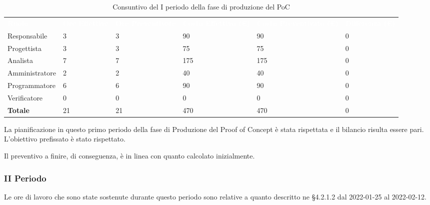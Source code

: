 \begin{table}[H]
\begin{center}
\renewcommand{\arraystretch}{1.5}
\begin{tabular}{ m{}<{\centering}  m{}<{\centering} m{}<{\centering} m{}<{\centering} m{}<{\centering} m{}<{\centering}}
	\rowcolor{darkblue}
	\textcolor{white}{\textbf{Ruolo}} & \textcolor{white}{\textbf{Ore Effettive}} & \textcolor{white}{\textbf{Ore Preventivate}}&\textcolor{white}{\textbf{Costo Effettivo (\euro)}}&\textcolor{white}{\textbf{Costo Preventivato (\euro)}}&\textcolor{white}{\textbf{Differenza (\euro)}}\\ 
	
	Responsabile  & 3 & 3 & 90 & 90 & 0 \\	
	
	Progettista & 3 & 3 & 75 & 75 & 0 \\
	
	Analista & 7 & 7 & 175 & 175 & 0 \\

	Amministratore & 2 & 2 & 40 & 40 & 0 \\
	
	Programmatore & 6 & 6 & 90 & 90 &  0 \\
	
	Verificatore & 0 & 0 & 0 & 0 & 0 \\
	
	\textbf{Totale} & 21 & 21 & 470 & 470 & 0 \\
	
\end{tabular}
\caption{Consuntivo del I periodo della fase di produzione del PoC}
\end{center}
\end{table}

La pianificazione in questo primo periodo della fase di Produzione del Proof of Concept è stata rispettata e il bilancio risulta essere pari. L'obiettivo prefissato è stato rispettato.

Il preventivo a finire, di conseguenza, è in linea con quanto calcolato inizialmente.

\pagebreak

\subsubsection{II Periodo}
Le ore di lavoro che sono state sostenute durante questo periodo sono relative a quanto descritto ne §4.2.1.2 dal 2022-01-25 al 2022-02-12.

